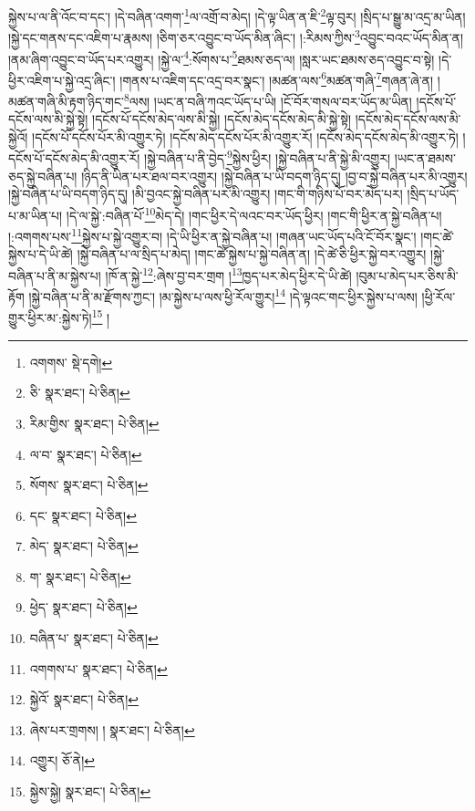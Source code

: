 སྐྱེས་པ་ལ་ནི་འོང་བ་དང་། །དེ་བཞིན་འགག་\footnote{འགགས་  སྡེ་དགེ། }ལ་འགྲོ་བ་མེད། །དེ་ལྟ་ཡིན་ན་ཇི་\footnote{ཅི་  སྣར་ཐང་།  པེ་ཅིན། }ལྟ་བུར། །སྲིད་པ་སྒྱུ་མ་འདྲ་མ་ཡིན། །སྐྱེ་དང་གནས་དང་འཇིག་པ་རྣམས། །ཅིག་ཅར་འབྱུང་བ་ཡོད་མིན་ཞིང་། །:རིམས་ཀྱིས་\footnote{རིམ་གྱིས་  སྣར་ཐང་།  པེ་ཅིན། }འབྱུང་བའང་ཡོད་མིན་ན། །ནམ་ཞིག་འབྱུང་བ་ཡོད་པར་འགྱུར། །སྐྱེ་ལ་\footnote{ལ་བ་  སྣར་ཐང་།  པེ་ཅིན། }:སོགས་པ་\footnote{སོགས་  སྣར་ཐང་།  པེ་ཅིན། }ཐམས་ཅད་ལ། །སླར་ཡང་ཐམས་ཅད་འབྱུང་བ་སྟེ། །དེ་ཕྱིར་འཇིག་པ་སྐྱེ་འདྲ་ཞིང་། །གནས་པ་འཇིག་དང་འདྲ་བར་སྣང་། །མཚན་ལས་\footnote{དང་  སྣར་ཐང་།  པེ་ཅིན། }མཚན་གཞི་\footnote{མེད་  སྣར་ཐང་།  པེ་ཅིན། }གཞན་ཞེ་ན། །མཚན་གཞི་མི་རྟག་ཉིད་གང་\footnote{ག་  སྣར་ཐང་།  པེ་ཅིན། }ལས། །ཡང་ན་བཞི་ཀའང་ཡོད་པ་ཡི། །ངོ་བོར་གསལ་བར་ཡོད་མ་ཡིན། །དངོས་པོ་དངོས་ལས་མི་སྐྱེ་སྟེ། །དངོས་པོ་དངོས་མེད་ལས་མི་སྐྱེ། །དངོས་མེད་དངོས་མེད་མི་སྐྱེ་སྟེ། །དངོས་མེད་དངོས་ལས་མི་སྐྱེའོ། །དངོས་པོ་དངོས་པོར་མི་འགྱུར་ཏེ། །དངོས་མེད་དངོས་པོར་མི་འགྱུར་རོ། །དངོས་མེད་དངོས་མེད་མི་འགྱུར་ཏེ། །དངོས་པོ་དངོས་མེད་མི་འགྱུར་རོ། །སྐྱེ་བཞིན་པ་ནི་བྱེད་\footnote{ཕྱེད་  སྣར་ཐང་།  པེ་ཅིན། }སྐྱེས་ཕྱིར། །སྐྱེ་བཞིན་པ་ནི་སྐྱེ་མི་འགྱུར། །ཡང་ན་ཐམས་ཅད་སྐྱེ་བཞིན་པ། །ཉིད་ནི་ཡིན་པར་ཐལ་བར་འགྱུར། །སྐྱེ་བཞིན་པ་ཡི་བདག་ཉིད་དུ། །བྱ་བ་སྐྱེ་བཞིན་པར་མི་འགྱུར། །སྐྱེ་བཞིན་པ་ཡི་བདག་ཉིད་དུ། །མི་བྱའང་སྐྱེ་བཞིན་པར་མི་འགྱུར། །གང་གི་གཉིས་པོ་བར་མེད་པར། །སྲིད་པ་ཡོད་པ་མ་ཡིན་པ། །དེ་ལ་སྐྱེ་:བཞིན་པོ་\footnote{བཞིན་པ་  སྣར་ཐང་།  པེ་ཅིན། }མེད་དེ། །གང་ཕྱིར་དེ་ལའང་བར་ཡོད་ཕྱིར། །གང་གི་ཕྱིར་ན་སྐྱེ་བཞིན་པ། །:འགགས་པས་\footnote{འགགས་པ་  སྣར་ཐང་།  པེ་ཅིན། }སྐྱེས་པ་སྐྱེ་འགྱུར་བ། །དེ་ཡི་ཕྱིར་ན་སྐྱེ་བཞིན་པ། །གཞན་ཡང་ཡོད་པའི་ངོ་བོར་སྣང་། །གང་ཚེ་སྐྱེས་པ་དེ་ཡི་ཚེ། །སྐྱེ་བཞིན་པ་ལ་སྲིད་པ་མེད། །གང་ཚེ་སྐྱེས་པ་སྐྱེ་བཞིན་ན། །དེ་ཚེ་ཅི་ཕྱིར་སྐྱེ་བར་འགྱུར། །སྐྱེ་བཞིན་པ་ནི་མ་སྐྱེས་པ། །ཁོ་ན་སྐྱེ་\footnote{སྐྱེའོ་  སྣར་ཐང་།  པེ་ཅིན། }:ཞེས་བྱ་བར་གྲག །\footnote{ཞེས་པར་གྲགས། །  སྣར་ཐང་།  པེ་ཅིན། }ཁྱད་པར་མེད་ཕྱིར་དེ་ཡི་ཚེ། །བུམ་པ་མེད་པར་ཅིས་མི་རྟོག །སྐྱེ་བཞིན་པ་ནི་མ་རྫོགས་ཀྱང་། །མ་སྐྱེས་པ་ལས་ཕྱི་རོལ་གྱུར།\footnote{འགྱུར།  ཅོ་ནེ། } །དེ་ལྟའང་གང་ཕྱིར་སྐྱེས་པ་ལས། །ཕྱི་རོལ་གྱུར་ཕྱིར་མ་:སྐྱེས་ཏེ།\footnote{སྐྱེས་སྐྱེ།  སྣར་ཐང་།  པེ་ཅིན། } །
